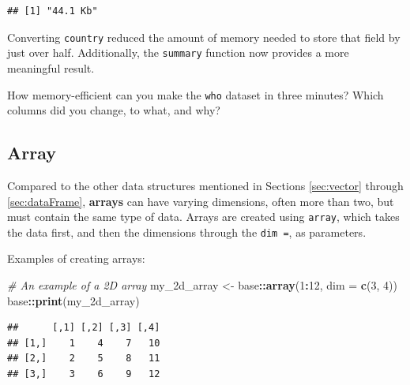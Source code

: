 \documentclass[
]{book}
\newenvironment{Shaded}{\begin{snugshade}}{\end{snugshade}}
\newcommand{\AttributeTok}[1]{\textcolor[rgb]{0.13,0.29,0.53}{#1}}
\newcommand{\CommentTok}[1]{\textcolor[rgb]{0.56,0.35,0.01}{\textit{#1}}}
\newcommand{\DecValTok}[1]{\textcolor[rgb]{0.00,0.00,0.81}{#1}}
\newcommand{\FunctionTok}[1]{\textcolor[rgb]{0.13,0.29,0.53}{\textbf{#1}}}
\newcommand{\NormalTok}[1]{#1}
\newcommand{\OtherTok}[1]{\textcolor[rgb]{0.56,0.35,0.01}{#1}}
\newcommand{\SpecialCharTok}[1]{\textcolor[rgb]{0.81,0.36,0.00}{\textbf{#1}}}
\newcommand{\StringTok}[1]{\textcolor[rgb]{0.31,0.60,0.02}{#1}}
\begin{document}
\begin{Shaded}
\end{Shaded}

\begin{verbatim}
## [1] "44.1 Kb"
\end{verbatim}

Converting \texttt{country} reduced the amount of memory needed to store that field by just over half. Additionally, the \texttt{summary} function now provides a more meaningful result.

How memory-efficient can you make the \texttt{who} dataset in three minutes? Which columns did you change, to what, and why?

\subsection{Array}\label{sec:array}

Compared to the other data structures mentioned in Sections \ref{sec:vector} through \ref{sec:dataFrame}, \textbf{arrays} can have varying dimensions, often more than two, but must contain the same type of data. Arrays are created using \texttt{array}, which takes the data first, and then the dimensions through the \texttt{dim\ =}, as parameters.

Examples of creating arrays:

\begin{Shaded}
\begin{Highlighting}[]
\CommentTok{\# An example of a 2D array}
\NormalTok{my\_2d\_array }\OtherTok{\textless{}{-}}\NormalTok{ base}\SpecialCharTok{::}\FunctionTok{array}\NormalTok{(}\DecValTok{1}\SpecialCharTok{:}\DecValTok{12}\NormalTok{, }\AttributeTok{dim =} \FunctionTok{c}\NormalTok{(}\DecValTok{3}\NormalTok{, }\DecValTok{4}\NormalTok{))  }
\NormalTok{base}\SpecialCharTok{::}\FunctionTok{print}\NormalTok{(my\_2d\_array)}
\end{Highlighting}
\end{Shaded}

\begin{verbatim}
##      [,1] [,2] [,3] [,4]
## [1,]    1    4    7   10
## [2,]    2    5    8   11
## [3,]    3    6    9   12
\end{verbatim}
\end{document}
